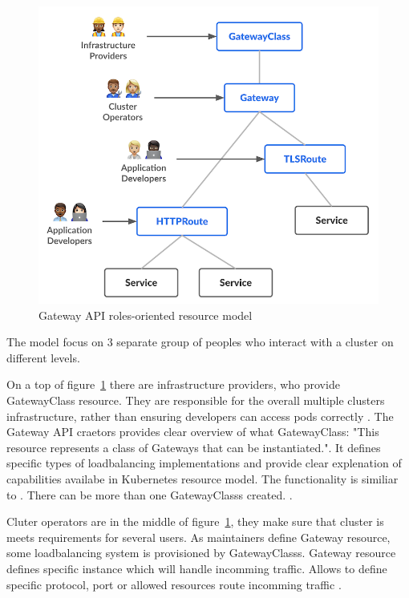 \begin{figure}[tbh]
    \centering
    \includegraphics[width=0.7\columnwidth]{images/gateway-api-resource-model.png}
    \caption{Gateway API roles-oriented resource model \cite{KubernetesGatewayAPI}}
    \label{fig:gatewayApiResourceModel}
\end{figure}

The model focus on 3 separate group of peoples who interact with a cluster on different levels.

On a top of figure~\ref{fig:gatewayApiResourceModel} there are infrastructure providers, who provide GatewayClass resource. They are responsible for the overall multiple clusters infrastructure, rather than ensuring developers can access pods correctly \cite{KubernetesGatewayAPI}. The Gateway API craetors provides clear overview of what GatewayClass: "This resource represents a class of Gateways that can be instantiated.". It defines specific types of loadbalancing implementations and provide clear explenation of capabilities availabe in Kubernetes resource model.  The functionality is similiar to \textit{} \cite{KubernetesGatewayAPI} \cite{KubernetesGatewayClass}. There can be more than one GatewayClasss created. \cite{KubernetesGatewayAPI}. 

Cluter operators are in the middle of figure~\ref{fig:gatewayApiResourceModel}, they make sure that cluster is meets requirements for several users. As maintainers define Gateway resource, some loadbalancing system is provisioned by GatewayClasss. Gateway resource defines specific instance which will handle incomming traffic. Allows to define specific protocol, port or allowed resources route incomming traffic \cite{KubernetesGatewayAPI} \cite{KubernetesGateway}.

